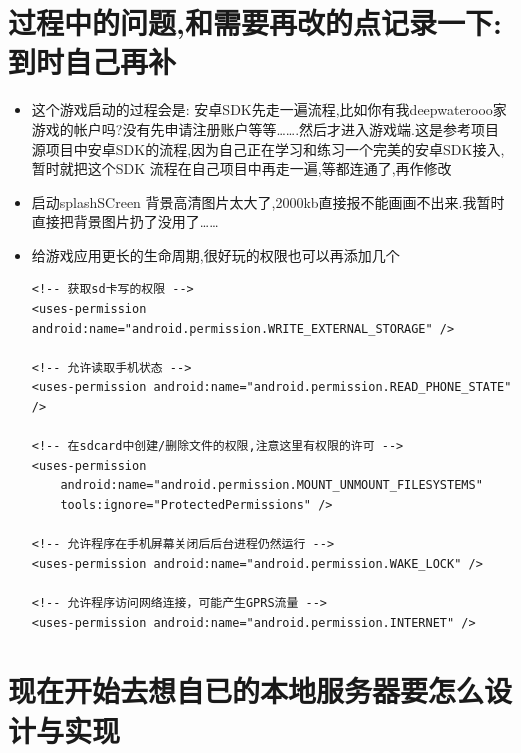 \documentclass[9pt, b5paper]{article}
\begin{document}
\section{过程中的问题,和需要再改的点记录一下: 到时自己再补}
\label{sec-3}
\begin{itemize}
\item 这个游戏启动的过程会是: 安卓SDK先走一遍流程,比如你有我deepwaterooo家游戏的帐户吗?没有先申请注册账户等等\ldots{}\ldots{}.然后才进入游戏端.这是参考项目源项目中安卓SDK的流程,因为自己正在学习和练习一个完美的安卓SDK接入,暂时就把这个SDK 流程在自己项目中再走一遍,等都连通了,再作修改
\item 启动splashSCreen 背景高清图片太大了,2000kb直接报不能画画不出来.我暂时直接把背景图片扔了没用了\ldots{}\ldots{}
\item 给游戏应用更长的生命周期,很好玩的权限也可以再添加几个
\begin{verbatim}
<!-- 获取sd卡写的权限 -->
<uses-permission android:name="android.permission.WRITE_EXTERNAL_STORAGE" />

<!-- 允许读取手机状态 -->
<uses-permission android:name="android.permission.READ_PHONE_STATE" />

<!-- 在sdcard中创建/删除文件的权限,注意这里有权限的许可 -->
<uses-permission
    android:name="android.permission.MOUNT_UNMOUNT_FILESYSTEMS"
    tools:ignore="ProtectedPermissions" />

<!-- 允许程序在手机屏幕关闭后后台进程仍然运行 -->
<uses-permission android:name="android.permission.WAKE_LOCK" />

<!-- 允许程序访问网络连接，可能产生GPRS流量 -->
<uses-permission android:name="android.permission.INTERNET" />
\end{verbatim}
\end{itemize}

\section{现在开始去想自已的本地服务器要怎么设计与实现}
\label{sec-4}
\end{document}
